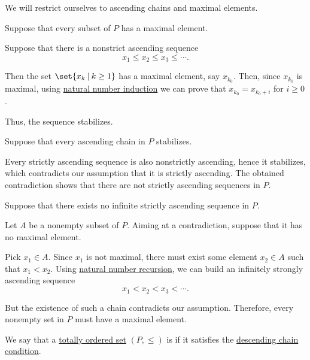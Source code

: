 \begin{defproof}
  We will restrict ourselves to ascending chains and maximal elements.

   Suppose that every subset of \( P \) has a maximal element.

  Suppose that there is a nonstrict ascending sequence
  \begin{equation*}
    x_1 \leq x_2 \leq x_3 \leq \cdots.
  \end{equation*}

  Then the set \( \set{ x_k \given k \geq 1 } \) has a maximal element, say \( x_{k_0} \). Then, since \( x_{k_0} \) is maximal, using \hyperref[rem:induction/peano_arithmetic]{natural number induction} we can prove that \( x_{k_0} = x_{k_0 + i} \) for \( i \geq 0 \).

  Thus, the sequence stabilizes.

   Suppose that every ascending chain in \( P \) stabilizes.

  Every strictly ascending sequence is also nonstrictly ascending, hence it stabilizes, which contradicts our assumption that it is strictly ascending. The obtained contradiction shows that there are not strictly ascending sequences in \( P \).

   Suppose that there exists no infinite strictly ascending sequence in \( P \).

  Let \( A \) be a nonempty subset of \( P \). Aiming at a contradiction, suppose that it has no maximal element.

  Pick \( x_1 \in A \). Since \( x_1 \) is not maximal, there must exist some element \( x_2 \in A \) such that \( x_1 < x_2 \). Using \hyperref[rem:natural_number_recursion]{natural number recursion}, we can build an infinitely strongly ascending sequence
  \begin{equation*}
    x_1 < x_2 < x_3 < \cdots.
  \end{equation*}

  But the existence of such a chain contradicts our assumption. Therefore, every nonempty set in \( P \) must have a maximal element.
\end{defproof}

\begin{definition}\label{def:well_ordered_set}
  We say that a \hyperref[def:totally_ordered_set]{totally ordered set} \( (P, \leq) \) is  if it satisfies the \hyperref[def:chain_condition]{descending chain condition}.
\end{definition}

